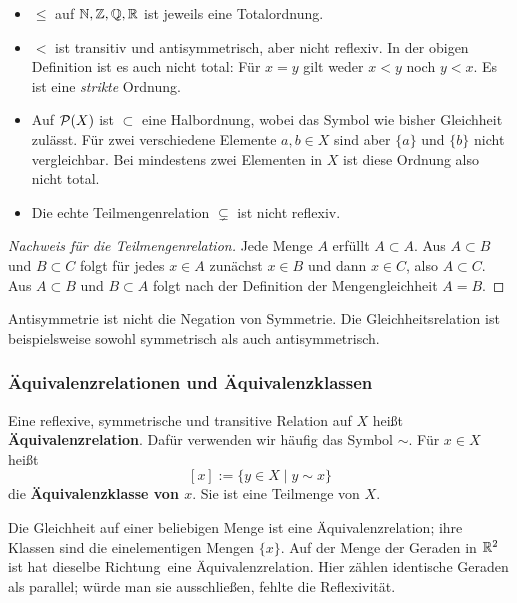 \begin{beispiel}
\begin{itemize}
    \item $\le$ auf $\mathbb{N},\mathbb{Z},\mathbb{Q},\mathbb{R}$ ist jeweils eine Totalordnung.
    \item $<$ ist transitiv und antisymmetrisch, aber nicht reflexiv.
    In der obigen Definition ist es auch nicht total: Für $x=y$ gilt
    weder $x<y$ noch $y<x$. Es ist eine \emph{strikte} Ordnung.
    \item Auf $\mathcal{P}(X)$ ist $\subset$ eine Halbordnung, wobei das Symbol
    wie bisher Gleichheit zulässt. Für zwei verschiedene Elemente
    $a,b\in X$ sind aber $\{a\}$ und $\{b\}$ nicht vergleichbar.
    Bei mindestens zwei Elementen in $X$ ist diese Ordnung also nicht total.
    \item Die echte Teilmengenrelation $\subsetneq$ ist nicht reflexiv.
\end{itemize}
\end{beispiel}

\begin{proof}[Nachweis für die Teilmengenrelation]
Jede Menge $A$ erfüllt $A\subset A$. Aus $A\subset B$ und $B\subset C$
folgt für jedes $x\in A$ zunächst $x\in B$ und dann $x\in C$, also
$A\subset C$. Aus $A\subset B$ und $B\subset A$ folgt nach der
Definition der Mengengleichheit $A=B$.
\end{proof}

\begin{bemerkung}
Antisymmetrie ist nicht die Negation von Symmetrie. Die Gleichheitsrelation
ist beispielsweise sowohl symmetrisch als auch antisymmetrisch.
\end{bemerkung}

\subsubsection*{Äquivalenzrelationen und Äquivalenzklassen}
\begin{definition}[Äquivalenzrelation]
Eine reflexive, symmetrische und transitive Relation auf $X$ heißt
\textbf{Äquivalenzrelation}. Dafür verwenden wir häufig das Symbol $\sim$.
Für $x\in X$ heißt
\[
    [x]:=\{y\in X\mid y\sim x\}
\]
die \textbf{Äquivalenzklasse von $x$}. Sie ist eine Teilmenge von $X$.
\end{definition}

\begin{beispiel}
Die Gleichheit auf einer beliebigen Menge ist eine Äquivalenzrelation;
ihre Klassen sind die einelementigen Mengen $\{x\}$.
Auf der Menge der Geraden in $\mathbb{R}^2$ ist \glqq hat dieselbe Richtung\grqq\
eine Äquivalenzrelation. Hier zählen identische Geraden als parallel;
würde man sie ausschließen, fehlte die Reflexivität.
\end{beispiel}

